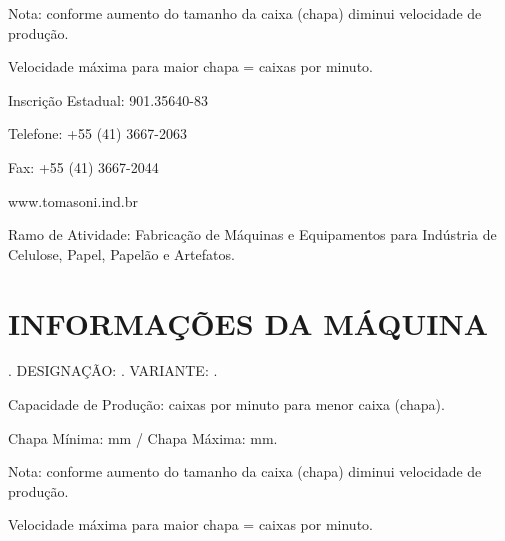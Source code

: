 Nota: conforme aumento do tamanho da caixa (chapa) diminui velocidade de produção.

Velocidade máxima para maior chapa = \productionCapacitymaximumSheet \space caixas por minuto.

\vspace*{\fill}
\vspace*{\fill}
\vspace*{\fill}

Inscrição Estadual: 901.35640-83

Telefone: +55 (41) 3667-2063

Fax: +55 (41) 3667-2044

www.tomasoni.ind.br

Ramo de Atividade: Fabricação de Máquinas e Equipamentos para Indústria de Celulose, Papel, Papelão e Artefatos.

\vspace{40 pt}

\section{\large{INFORMAÇÕES DA MÁQUINA}}


\machineName \space. DESIGNAÇÃO: \machineShortName. VARIANTE: \variant.

Capacidade de Produção: \productionCapacityminimumSheet \space caixas por minuto para menor caixa (chapa).

Chapa Mínima: \minimumSheet mm / Chapa Máxima: \maximumSheet mm.

Nota: conforme aumento do tamanho da caixa (chapa) diminui velocidade de produção.

Velocidade máxima para maior chapa = \productionCapacitymaximumSheet \space caixas por minuto.

\vspace*{\fill}
\vspace*{\fill}
\vspace*{\fill}